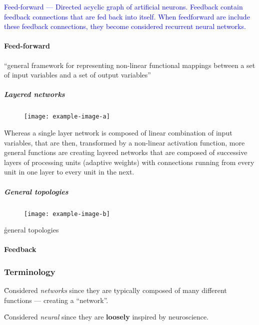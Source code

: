 \textcolor{blue}{Feed-forward --- Directed acyclic graph of artificial neurons. Feedback contain feedback connections that are fed back into itself. When feedforward are include these feedback connections, they become considered recurrent neural networks.}

\paragraph{Feed-forward}

\r{``general framework for representing non-linear functional mappings between a set of input variables and a set of output variables''}

\subparagraph{Layered networks}

\begin{figure}[htp]
	\centering
	\texttt{[image: example-image-a]}\hfil
	\caption{}
	\label{fig:foundations_ann_layered_network}
\end{figure}

\r{Whereas a single layer network is composed of linear combination of input variables, that are then, transformed by a non-linear activation function, more general functions are creating layered networks that are composed of successive layers of processing units (adaptive weights) with connections running from every unit in one layer to every unit in the next.}

\subparagraph{General topologies}

\begin{figure}[htp]
	\centering
	\texttt{[image: example-image-b]}\hfil
	\caption{}
	\label{fig:foundations_ann_general_topology}
\end{figure}

\r{general topologies}

\paragraph{Feedback}

\subsubsection{Terminology}

\r{Considered \textit{networks} since they are typically composed of many different functions --- creating a ``network''.}

\r{Considered \textit{neural} since they are \textbf{loosely} inspired by neuroscience.}

